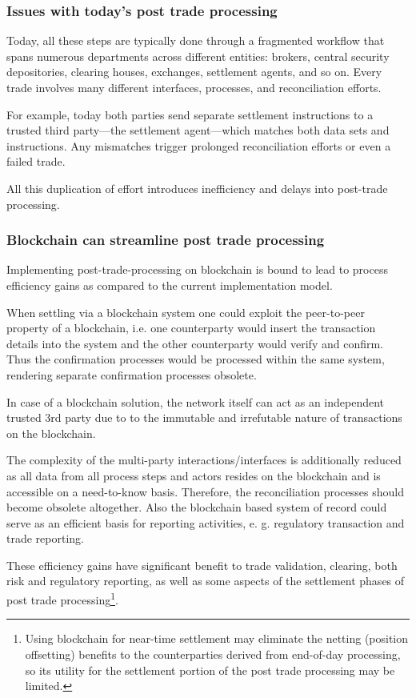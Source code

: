 \subsubsection{Issues with today's post trade processing}

Today, all these steps are typically done through a fragmented workflow that spans numerous departments across different entities: brokers, central security depositories, clearing houses, exchanges, settlement agents, and so on. Every trade involves many different interfaces, processes, and reconciliation efforts. 

For example, today both parties send separate settlement instructions to a trusted third party---the settlement agent---which matches both data sets and instructions. Any mismatches trigger prolonged reconciliation efforts or even a failed trade. 

All this duplication of effort introduces inefficiency and delays into post-trade processing.

\subsubsection{Blockchain can streamline post trade processing}

Implementing post-trade-processing on blockchain is bound to lead to process efficiency gains as compared to the current implementation model.

When settling via a blockchain system one could exploit the peer-to-peer property of a blockchain, i.e. one counterparty would insert the transaction details into the system and the other counterparty would verify and confirm.  Thus the confirmation processes would be processed within the same system, rendering separate confirmation processes obsolete.

 In case of a blockchain solution, the network itself can act as an independent trusted 3rd party due to to the immutable and irrefutable nature of transactions on the blockchain.

The complexity of the multi-party interactions/interfaces is additionally reduced as all data from all process steps and actors resides on the blockchain and is accessible on a need-to-know basis. Therefore, the reconciliation processes should become obsolete altogether. Also the blockchain based system of record could serve as an efficient basis for reporting activities, e. g. regulatory transaction and trade reporting.

These efficiency gains have significant benefit to trade validation, clearing, both risk and regulatory reporting, as well as some aspects of the settlement phases of post trade processing\footnote{Using blockchain for near-time settlement may eliminate the netting (position offsetting) benefits to the counterparties derived from end-of-day processing, so its utility for the settlement portion of the post trade processing may be limited.}.

